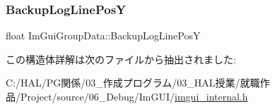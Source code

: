 \mbox{\label{struct_im_gui_group_data_af67f52c70f74a3b7bce8ce46affc856b}} 
\subsubsection{\texorpdfstring{Backup\+Log\+Line\+PosY}{BackupLogLinePosY}}
{\footnotesize\ttfamily float Im\+Gui\+Group\+Data\+::\+Backup\+Log\+Line\+PosY}



この構造体詳解は次のファイルから抽出されました\+:\begin{DoxyCompactItemize}
\item 
C\+:/\+H\+A\+L/\+P\+G関係/03\+\_\+作成プログラム/03\+\_\+\+H\+A\+L授業/就職作品/\+Project/source/06\+\_\+\+Debug/\+Im\+G\+U\+I/\mbox{\hyperlink{imgui__internal_8h}{imgui\+\_\+internal.\+h}}\end{DoxyCompactItemize}
